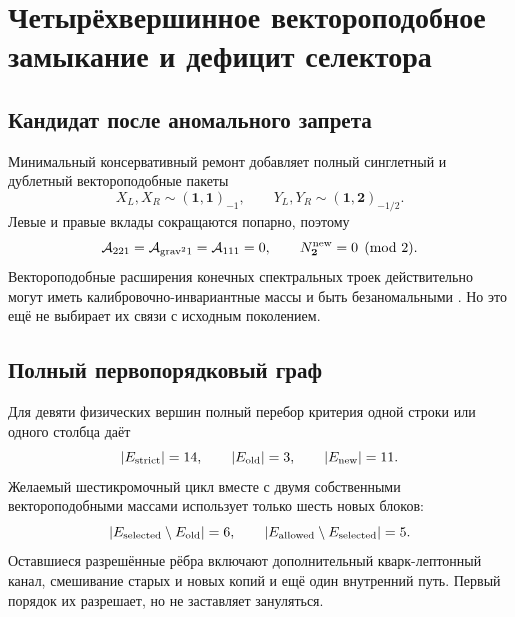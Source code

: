 \chapter{Четырёхвершинное вектороподобное замыкание и дефицит селектора}
\label{ch:v7-four-vertex-vectorlike-selector-gate}

\section{Кандидат после аномального запрета}

Минимальный консервативный ремонт добавляет полный синглетный и дублетный
вектороподобные пакеты
\begin{equation}
 X_L,X_R\sim(\mathbf1,\mathbf1)_{-1},\qquad
 Y_L,Y_R\sim(\mathbf1,\mathbf2)_{-1/2}.
 \label{eq:v7-vectorlike-four-vertex-content}
\end{equation}
Левые и правые вклады сокращаются попарно, поэтому
\begin{equation}
 \mathcal A_{221}=\mathcal A_{\mathrm{grav}^2 1}
 =\mathcal A_{111}=0,
 \qquad N_{\mathbf2}^{\rm new}=0\pmod2.
 \label{eq:v7-vectorlike-four-vertex-anomalies}
\end{equation}
Вектороподобные расширения конечных спектральных троек действительно могут
иметь калибровочно-инвариантные массы и быть безаномальными
\cite{v7vector-classification,v7vector-scalars}. Но это ещё не выбирает их
связи с исходным поколением.

\section{Полный первопорядковый граф}

Для девяти физических вершин полный перебор критерия одной строки или одного
столбца даёт
\begin{equation}
 |E_{\rm strict}|=14,\qquad
 |E_{\rm old}|=3,\qquad
 |E_{\rm new}|=11.
 \label{eq:v7-vectorlike-edge-count}
\end{equation}
Желаемый шестикромочный цикл вместе с двумя собственными
вектороподобными массами использует только шесть новых блоков:
\begin{equation}
 |E_{\rm selected}\setminus E_{\rm old}|=6,
 \qquad
 |E_{\rm allowed}\setminus E_{\rm selected}|=5.
 \label{eq:v7-vectorlike-edge-deficit}
\end{equation}
Оставшиеся разрешённые рёбра включают дополнительный кварк-лептонный канал,
смешивание старых и новых копий и ещё один внутренний путь. Первый порядок
их разрешает, но не заставляет зануляться.

